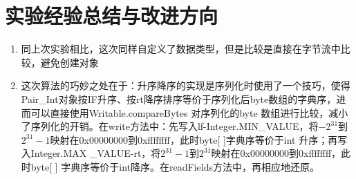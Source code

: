 \documentclass[a4paper,UTF8]{article}
\numberwithin{equation}{section}
\begin{document}
\section{实验经验总结与改进方向}
\begin{enumerate}[1)]
    \item 同上次实验相比，这次同样自定义了数据类型，但是比较是直接在字节流中比较，避免创建对象
    \item 这次算法的巧妙之处在于：升序降序的实现是序列化时使用了一个技巧，使得Pair\_Int对象按IF升序、按rt降序排序等价于序列化后byte数组的字典序，进而可以直接使用Writable.compareBytes 对序列化的byte 数组进行比较，减小了序列化的开销。在write方法中：先写入lf-Integer.MIN\_VALUE，将$-2^{31}$到$2^{31}-1$映射在0x00000000到0xffffffff，此时byte[ ]字典序等价于int 升序；再写入Integer.MAX \_VALUE-rt，将$2^{31}-1$到$2^{31}$映射在0x00000000到0xffffffff，此时byte[ ] 字典序等价于int降序。在readFields方法中，再相应地还原。
\end{enumerate}


\end{document}
